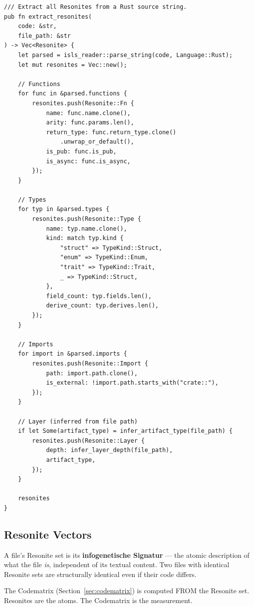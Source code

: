 \documentclass[11pt,a4paper]{article}
\begin{document}
\begin{lstlisting}[style=rust]
/// Extract all Resonites from a Rust source string.
pub fn extract_resonites(
    code: &str, 
    file_path: &str
) -> Vec<Resonite> {
    let parsed = isls_reader::parse_string(code, Language::Rust);
    let mut resonites = Vec::new();
    
    // Functions
    for func in &parsed.functions {
        resonites.push(Resonite::Fn {
            name: func.name.clone(),
            arity: func.params.len(),
            return_type: func.return_type.clone()
                .unwrap_or_default(),
            is_pub: func.is_pub,
            is_async: func.is_async,
        });
    }
    
    // Types
    for typ in &parsed.types {
        resonites.push(Resonite::Type {
            name: typ.name.clone(),
            kind: match typ.kind {
                "struct" => TypeKind::Struct,
                "enum" => TypeKind::Enum,
                "trait" => TypeKind::Trait,
                _ => TypeKind::Struct,
            },
            field_count: typ.fields.len(),
            derive_count: typ.derives.len(),
        });
    }
    
    // Imports
    for import in &parsed.imports {
        resonites.push(Resonite::Import {
            path: import.path.clone(),
            is_external: !import.path.starts_with("crate::"),
        });
    }
    
    // Layer (inferred from file path)
    if let Some(artifact_type) = infer_artifact_type(file_path) {
        resonites.push(Resonite::Layer {
            depth: infer_layer_depth(file_path),
            artifact_type,
        });
    }
    
    resonites
}
\end{lstlisting}

\subsection{Resonite Vectors}

A file's Resonite set is its \textbf{infogenetische Signatur} --- 
the atomic description of what the file \emph{is}, independent of 
its textual content. Two files with identical Resonite sets are 
structurally identical even if their code differs.

The Codematrix (Section~\ref{sec:codematrix}) is computed FROM 
the Resonite set. Resonites are the atoms. The Codematrix is 
the measurement.


\end{document}
